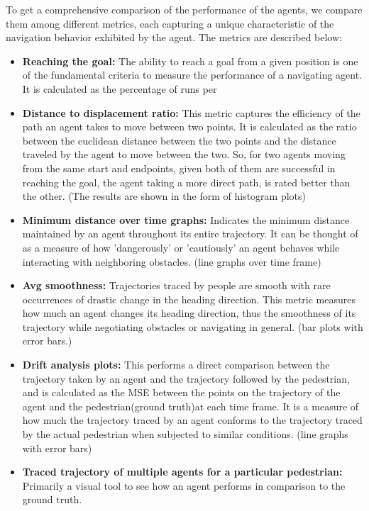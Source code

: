 To get a comprehensive comparison of the performance of the agents, we compare them among different metrics, each capturing a unique characteristic of the navigation behavior exhibited by the agent. The metrics are described below:
\begin{itemize}
        \item \textbf{Reaching the goal:} The ability to reach a goal from a given position is one of the fundamental criteria to measure the performance of a navigating agent. It is calculated as the percentage of runs per 
        \item \textbf{Distance to displacement ratio:} This metric captures the efficiency of the path an agent takes to move between two points. It is calculated as the ratio between the euclidean distance between the two points and the distance traveled by the agent to move between the two. So, for two agents moving from the same start and endpoints, given both of them are successful in reaching the goal, the agent taking a more direct path, is rated better than the other. (The results are shown in the form of histogram plots)
        \item \textbf{Minimum distance over time graphs:} Indicates the minimum distance maintained by an agent throughout its entire trajectory. It can be thought of as a measure of how 'dangerously' or 'cautiously' an agent behaves while interacting with neighboring obstacles. (line graphs over time frame)
        \item \textbf{Avg smoothness:} Trajectories traced by people are smooth with rare occurrences of drastic change in the heading direction. This metric measures how much an agent changes its heading direction, thus the smoothness of its trajectory while negotiating obstacles or navigating in general. (bar plots with error bars.)
        \item \textbf{Drift analysis plots: }This performs a direct comparison between the trajectory taken by an agent and the trajectory followed by the pedestrian, and is calculated as the MSE between the points on the trajectory of the agent and the pedestrian(ground truth)at each time frame. It is a measure of how much the trajectory traced by an agent conforms to the trajectory traced by the actual pedestrian when subjected to similar conditions. (line graphs with error bars)
        \item \textbf{Traced trajectory of multiple agents for a particular pedestrian:} Primarily a visual tool to see how an agent performs in comparison to the ground truth.
\end{itemize}

